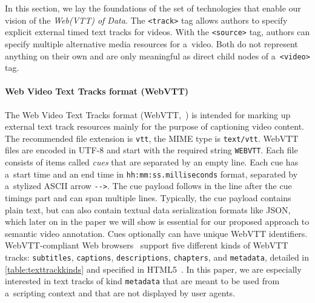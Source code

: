 \documentclass{sig-alternate}
\begin{document}
In this section, we lay the foundations of the set of technologies
that enable our vision of the \emph{Web(VTT) of Data}.
The \texttt{<track>} tag allows authors to specify explicit
external timed text tracks for videos.
With the \texttt{<source>} tag, authors can specify
multiple alternative media resources for a~video.
Both do not represent anything on their own
and are only meaningful as direct child nodes of a~\texttt{<video>} tag.

\paragraph{Web Video Text Tracks format (WebVTT)}

The Web Video Text Tracks format (WebVTT,~\cite{pfeiffer2013webvtt})
is intended for marking up external text track resources mainly
for the purpose of captioning video content.
The recommended file extension is \texttt{vtt},
the MIME type is \texttt{text/vtt}.
WebVTT files are encoded in UTF-8 and
start with the required string \texttt{WEBVTT}.
Each file consists of items called \emph{cues}
that are separated by an empty line.
Each cue has a~start time and an end time in
\texttt{hh:mm:ss.milliseconds} format,
separated by a~stylized ASCII arrow \texttt{-}\texttt{->}.
The cue payload follows in the line after the cue timings part
and can span multiple lines.
Typically, the cue payload contains plain text,
but can also contain textual data serialization formats like JSON,
which later on in the paper we will show is essential
for our proposed approach to semantic video annotation.
Cues optionally can have unique WebVTT identifiers.
WebVTT-compliant Web browsers~\cite{dutton2012trackelement}
support five different kinds of
WebVTT tracks: \texttt{subtitles}, \texttt{captions},
\texttt{descriptions}, \texttt{chapters}, and \texttt{metadata},
detailed in \autoref{table:texttrackkinds}
and specified in HTML5~\cite{berjon2013html5}.
In this paper, we are especially interested in
text tracks of kind \texttt{metadata}
that are meant to be used from a~scripting context and
that are not displayed by user agents.
\end{document}
